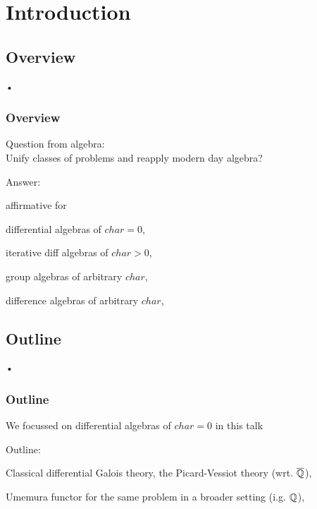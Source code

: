 \section{Introduction}
\subsection{Overview}

\begin{frame}{•}
\frametitle{Overview}
\bi
\item<1-> Question from algebra:\\
\indent Unify classes of problems and reapply modern day algebra?\\
\item<2-> Answer:
\begin{block}{affirmative for}
\bi
\item<3-> differential algebras of $char = 0$,
\item<4-> iterative diff algebras of $char > 0$,
\item<5-> group algebras of arbitrary $char$,
\item<6-> difference algebras of arbitrary $char$,
\ei
\end{block}
\ei
\end{frame}

\subsection{Outline}

\begin{frame}{•}
\frametitle{Outline}
\bi
\item We focussed on differential algebras of $char = 0$ in this talk
\item Outline:
\
\bn
\item Classical differential Galois theory, the Picard-Vessiot theory (wrt. $\overline{\mathbb{Q}}$),
\item Umemura functor for the same problem in a broader setting (i.g. $\mathbb{Q}$),
\en
\ei
\end{frame}
